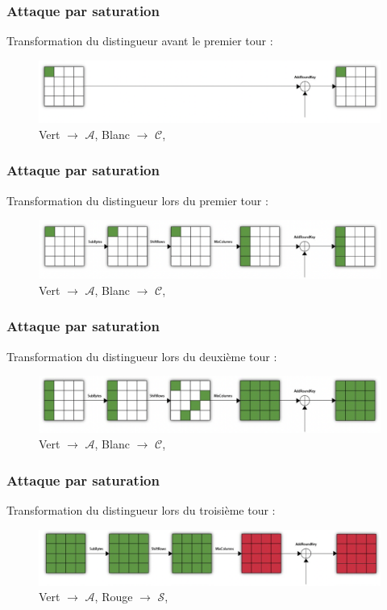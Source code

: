 \documentclass{beamer}
\begin{document}
	\begin{frame}
		\frametitle{Attaque par saturation}
		Transformation du distingueur avant le premier tour :
		\begin{figure}
			\includegraphics[width=1\textwidth]{images/AES_round_0.png}
			\caption{
				{\scriptsize
					{\color{green} Vert $\rightarrow$ $\mathcal{A}$},
					Blanc $\rightarrow$ $\mathcal{C}$,
				}
			}
		\end{figure}
	\end{frame}

	\begin{frame}
		\frametitle{Attaque par saturation}
		Transformation du distingueur lors du premier tour :
		\begin{figure}
			\includegraphics[width=1\textwidth]{images/AES_round_1.png}
			\caption{
				{\scriptsize
					{\color{green} Vert $\rightarrow$ $\mathcal{A}$},
					Blanc $\rightarrow$ $\mathcal{C}$,
				}
			}
		\end{figure}
	\end{frame}

	\begin{frame}
		\frametitle{Attaque par saturation}
		Transformation du distingueur lors du deuxième tour :
		\begin{figure}
			\includegraphics[width=1\textwidth]{images/AES_round_2.png}
			\caption{
				{\scriptsize
					{\color{green} Vert $\rightarrow$ $\mathcal{A}$},
					Blanc $\rightarrow$ $\mathcal{C}$,
				}
			}
		\end{figure}
	\end{frame}

	\begin{frame}
		\frametitle{Attaque par saturation}
		Transformation du distingueur lors du troisième tour :
		\begin{figure}
			\includegraphics[width=1\textwidth]{images/AES_round_3.png}
			\caption{
				{\scriptsize
					{\color{green} Vert $\rightarrow$ $\mathcal{A}$},
					{\color{red} Rouge $\rightarrow$ $\mathcal{S}$},
				}
			}
		\end{figure}
	\end{frame}
\end{document}
